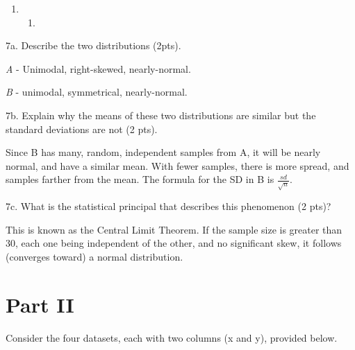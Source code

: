 \documentclass[]{article}
\begin{document}
\begin{enumerate}
\def\labelenumi{\arabic{enumi}.}
\setcounter{enumi}{5}
\item
  \begin{enumerate}
  \def\labelenumii{\Alph{enumii}.}
  \setcounter{enumii}{3}
  \item
  \end{enumerate}
\end{enumerate}

7a. Describe the two distributions (2pts).

\emph{A} - Unimodal, right-skewed, nearly-normal.

\emph{B} - unimodal, symmetrical, nearly-normal.

7b. Explain why the means of these two distributions are similar but the
standard deviations are not (2 pts).

Since B has many, random, independent samples from A, it will be nearly
normal, and have a similar mean. With fewer samples, there is more
spread, and samples farther from the mean. The formula for the SD in B
is \(\frac{sd}{\sqrt{n}}\).

7c. What is the statistical principal that describes this phenomenon (2
pts)?

This is known as the Central Limit Theorem. If the sample size is
greater than 30, each one being independent of the other, and no
significant skew, it follows (converges toward) a normal distribution.

\section{Part II}\label{part-ii}

Consider the four datasets, each with two columns (x and y), provided
below.
\end{document}
